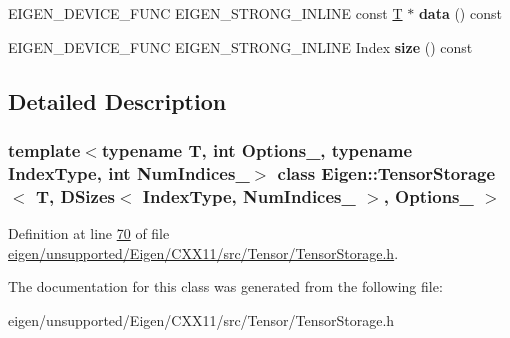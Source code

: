 \begin{DoxyCompactItemize}
\item 
\mbox{\label{class_eigen_1_1_tensor_storage_3_01_t_00_01_d_sizes_3_01_index_type_00_01_num_indices___01_4_00_01_options___01_4_ad8340efdf8cc7d083dd20bd6ee02ca9e}} 
E\+I\+G\+E\+N\+\_\+\+D\+E\+V\+I\+C\+E\+\_\+\+F\+U\+NC E\+I\+G\+E\+N\+\_\+\+S\+T\+R\+O\+N\+G\+\_\+\+I\+N\+L\+I\+NE const \hyperlink{group___sparse_core___module}{T} $\ast$ {\bfseries data} () const
\item 
\mbox{\label{class_eigen_1_1_tensor_storage_3_01_t_00_01_d_sizes_3_01_index_type_00_01_num_indices___01_4_00_01_options___01_4_aac4efcc96d6e73021d1aca2af180449d}} 
E\+I\+G\+E\+N\+\_\+\+D\+E\+V\+I\+C\+E\+\_\+\+F\+U\+NC E\+I\+G\+E\+N\+\_\+\+S\+T\+R\+O\+N\+G\+\_\+\+I\+N\+L\+I\+NE Index {\bfseries size} () const
\end{DoxyCompactItemize}


\subsection{Detailed Description}
\subsubsection*{template$<$typename T, int Options\+\_\+, typename Index\+Type, int Num\+Indices\+\_\+$>$\newline
class Eigen\+::\+Tensor\+Storage$<$ T, D\+Sizes$<$ Index\+Type, Num\+Indices\+\_\+ $>$, Options\+\_\+ $>$}



Definition at line \hyperlink{eigen_2unsupported_2_eigen_2_c_x_x11_2src_2_tensor_2_tensor_storage_8h_source_l00070}{70} of file \hyperlink{eigen_2unsupported_2_eigen_2_c_x_x11_2src_2_tensor_2_tensor_storage_8h_source}{eigen/unsupported/\+Eigen/\+C\+X\+X11/src/\+Tensor/\+Tensor\+Storage.\+h}.



The documentation for this class was generated from the following file\+:\begin{DoxyCompactItemize}
\item 
eigen/unsupported/\+Eigen/\+C\+X\+X11/src/\+Tensor/\+Tensor\+Storage.\+h\end{DoxyCompactItemize}
